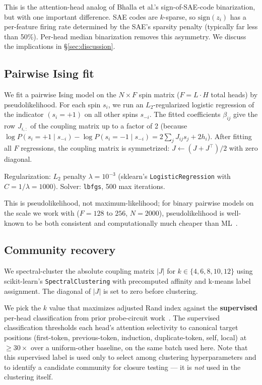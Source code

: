 \documentclass[11pt]{article}
\begin{document}
This is the attention-head analog of Bhalla et al.'s sign-of-SAE-code
binarization, but with one important difference. SAE codes are $k$-sparse,
so $\text{sign}(z_i)$ has a per-feature firing rate determined by the
SAE's sparsity penalty (typically far less than 50\%). Per-head median
binarization removes this asymmetry. We discuss the implications in
\S\ref{sec:discussion}.

\subsection{Pairwise Ising fit}
We fit a pairwise Ising model on the $N \times F$ spin matrix
($F = L \cdot H$ total heads) by pseudolikelihood. For each spin $s_i$, we
run an $L_2$-regularized logistic regression of the indicator $(s_i = +1)$
on all other spins $s_{-i}$. The fitted coefficients $\beta_{ij}$ give the
row $J_{i, :}$ of the coupling matrix up to a factor of 2 (because
$\log P(s_i = +1 \mid s_{-i}) - \log P(s_i = -1 \mid s_{-i}) = 2 \sum_j J_{ij} s_j + 2 h_i$).
After fitting all $F$ regressions, the coupling matrix is symmetrized:
$J \leftarrow (J + J^\top)/2$ with zero diagonal.

Regularization: $L_2$ penalty $\lambda = 10^{-3}$ (sklearn's
\texttt{LogisticRegression} with $C = 1/\lambda = 1000$). Solver:
\texttt{lbfgs}, 500 max iterations.

This is pseudolikelihood, not maximum-likelihood; for binary pairwise
models on the scale we work with ($F = 128$ to $256$, $N = 2000$),
pseudolikelihood is well-known to be both consistent and computationally
much cheaper than ML~\cite{besag1974, ravikumar2010}.

\subsection{Community recovery}
We spectral-cluster the absolute coupling matrix $|J|$ for
$k \in \{4, 6, 8, 10, 12\}$ using scikit-learn's
\texttt{SpectralClustering} with precomputed affinity and k-means label
assignment. The diagonal of $|J|$ is set to zero before clustering.

We pick the $k$ value that maximizes adjusted Rand index against the
\textbf{supervised} per-head classification from prior probe-circuit
work~\cite{xu2026}. The supervised classification thresholds each head's
attention selectivity to canonical target positions (first-token,
previous-token, induction, duplicate-token, self, local) at $\geq 30\times$
over a uniform-other baseline, on the same batch used here. Note that this
supervised label is used only to select among clustering hyperparameters
and to identify a candidate community for closure testing --- it is
\emph{not} used in the clustering itself.
\end{document}
